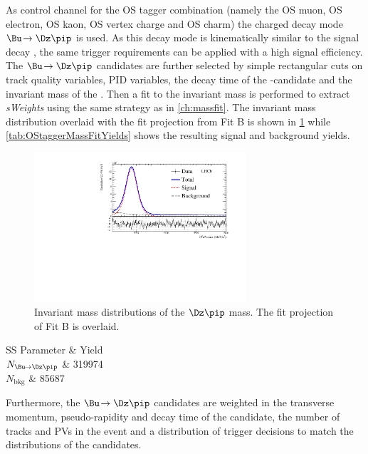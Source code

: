 As control channel for the OS tagger combination (namely the OS muon, OS electron, OS kaon, OS vertex charge and OS charm) the charged decay mode $\Bu\!\to\Dz\pip$ is used.
As this decay mode is kinematically  similar to the signal decay \BdToDpi, the same trigger requirements can be applied with a high signal efficiency.
The $\Bu\!\to\Dz\pip$ candidates are further selected by simple rectangular cuts on track quality variables, PID variables, the decay time of the \B-candidate and the invariant mass of the \Dz.
Then a fit to the invariant \Bu mass is performed to extract \emph{sWeights} using the same strategy as in \cref{ch:massfit}.
The invariant mass distribution overlaid with the fit projection from Fit B is shown in \cref{fig:OStaggerMassFit} while \cref{tab:OStaggerMassFitYields} shows the resulting signal and background yields.
\begin{figure}[tbp]
	\begin{center}
		\includegraphics[width=0.7\textwidth]{08FlavourTagging/figs/MDFitForSWeights_BeautyMass_Bu2D0Pi.pdf}
	\end{center}
	\caption{Invariant mass distributions of the $\Dz\pip$ mass.
    The fit projection of Fit B is overlaid.}
	\label{fig:OStaggerMassFit}
\end{figure}
\begin{table}
	\begin{center}
	\caption{Fitted yields of the $\Bu\!\to\Dz\pip$ control channel from Fit B.}
	\begin{tabular}{SS}
		\toprule
		{Parameter} & {Yield} \\
		\midrule
		{$N_{\Bu\!\to\Dz\pip}$}	& 319974 \\
		{$N_{\text{bkg}}$}		& 85687 \\
		\bottomrule
	\end{tabular}
	\label{tab:OStaggerMassFitYields}
  \end{center}
\end{table}
Furthermore, the $\Bu\!\to\Dz\pip$ candidates are weighted in the transverse momentum, pseudo-rapidity and decay time of the \B candidate, the number of tracks and PVs in the event and a distribution of trigger decisions to match the distributions of the \BdToDpi candidates.

